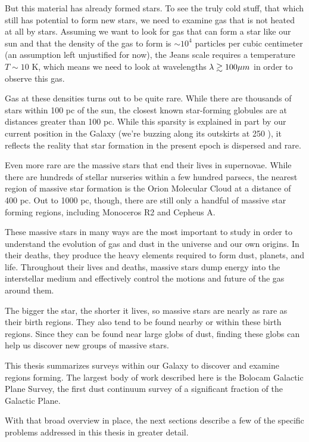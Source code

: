 But this material has already formed stars.  To see the truly cold stuff, that
which still has potential to form new stars, we need to examine gas that is not
heated at all by stars.  Assuming we want to look for gas that can form a star
like our sun and that the density of the gas to form is $\sim10^4$ particles
per cubic centimeter (an assumption left unjustified for now), the Jeans scale
requires a temperature $T\sim10$ K, which means we need to look at wavelengths
$\lambda \gtrsim 100 \mu m$ in order to observe this gas.

Gas at these densities turns out to be quite rare.  While there are thousands
of stars within 100 pc of the sun, the closest known star-forming globules are
at distances greater than 100 pc.  While this sparsity is explained in part by
our current position in the Galaxy (we're buzzing along its outskirts at 250
\kms), it reflects the reality that star formation in the present epoch is
dispersed and rare.

Even more rare are the massive stars that end their lives in supernovae.  While there
are hundreds of stellar nurseries within a few hundred parsecs, the nearest
region of massive star formation is the Orion Molecular Cloud at a distance of
400 pc.  Out to 1000 pc, though, there are still only a handful of massive star
forming regions, including Monoceros R2 and Cepheus A.

These massive stars in many ways are the most important to study in order to
understand the evolution of gas and dust in the universe and our own origins.
In their deaths, they produce the heavy elements required to form dust,
planets, and life.  Throughout their lives and deaths, massive stars dump
energy into the interstellar medium and effectively control the motions and
future of the gas around them.

The bigger the star, the shorter it lives, so massive stars are nearly as rare
as their birth regions.  They also tend to be found nearby or within these
birth regions.  Since they can be found near large globs of dust, finding these
globs can help us discover new groups of massive stars.

This thesis summarizes surveys within our Galaxy to discover and examine
regions forming.  The largest body of work described here is the Bolocam
Galactic Plane Survey, the first dust continuum survey of a significant
fraction of the Galactic Plane.

With that broad overview in place, the next sections describe a few of the
specific problems addressed in this thesis in greater detail.

